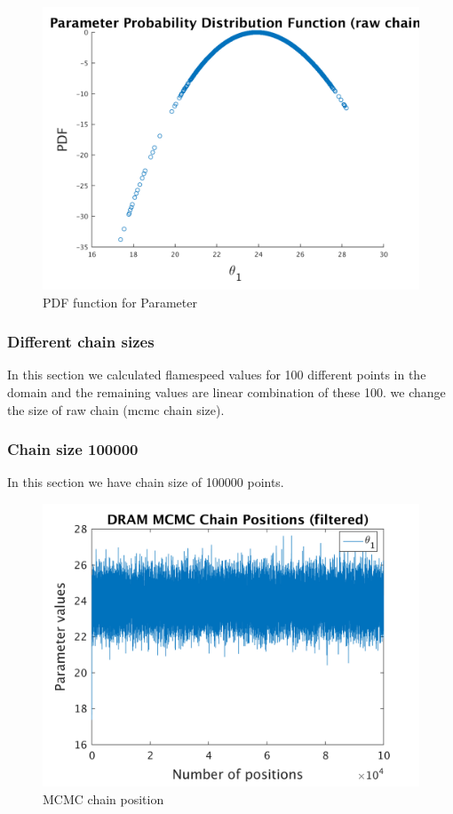 \begin{figure}[H]
  
  \centering
   \includegraphics[scale=0.75]{100_results/outputData_1000/ip_logLike_unified}
   \caption{PDF function for Parameter }
\end{figure}


\subsubsection{Different chain sizes }

In this section we calculated flamespeed values for 100 different points in the domain and the remaining values are linear combination of these 100. we change the size of raw chain (mcmc chain size). 

\subsubsection{Chain size 100000 }

In this section we have chain size of 100000 points. 

\begin{figure}[H]
  
  \centering
   \includegraphics[scale=0.75]{100_results/outputData_100000/simple_ip_chain_pos_filt}
   \caption{MCMC chain position }
\end{figure}


